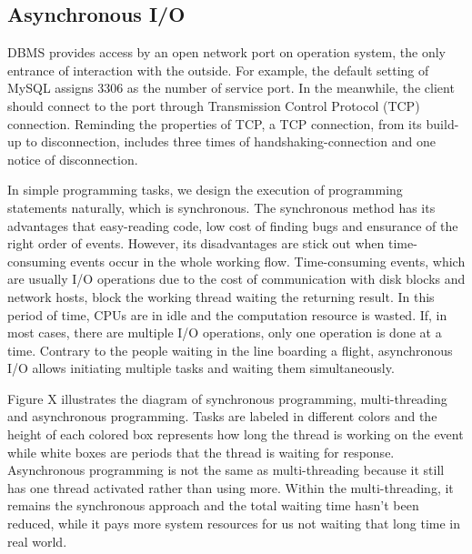 \documentclass[onecolumn, conference, 12pt]{IEEEtran}
\begin{document}
	\subsection{Asynchronous I/O}
	DBMS provides access by an open network port on operation system, the only entrance of interaction with the outside. For example, the default setting of MySQL assigns 3306 as the number of service port. In the meanwhile, the client should connect to the port through Transmission Control Protocol (TCP) connection. Reminding the properties of TCP, a TCP connection, from its build-up to disconnection, includes three times of handshaking-connection and one notice of disconnection. 

	In simple programming tasks, we design the execution of programming statements naturally, which is synchronous. The synchronous method has its advantages that easy-reading code, low cost of finding bugs and ensurance of the right order of events. However, its disadvantages are stick out when time-consuming events occur in the whole working flow. Time-consuming events, which are usually I/O operations due to the cost of communication with disk blocks and network hosts, block the working thread waiting the returning result. In this period of time, CPUs are in idle and the computation resource is wasted. If, in most cases, there are multiple I/O operations, only one operation is done at a time. Contrary to the people waiting in the line boarding a flight, asynchronous I/O allows initiating multiple tasks and waiting them simultaneously.

	Figure X illustrates the diagram of synchronous programming, multi-threading and asynchronous programming. Tasks are labeled in different colors and the height of each colored box represents how long the thread is working on the event while white boxes are periods that the thread is waiting for response. Asynchronous programming is not the same as multi-threading because it still has one thread activated rather than using more. Within the multi-threading, it remains the synchronous approach and the total waiting time hasn't been reduced, while it pays more system resources for us not waiting that long time in real world. 
\end{document}
